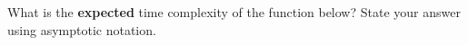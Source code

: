 \begin{prob}
    What is the \textbf{expected} time complexity of the function below? State
    your answer using asymptotic notation. 

    \inputminted{python}{code.py}

\end{prob}
